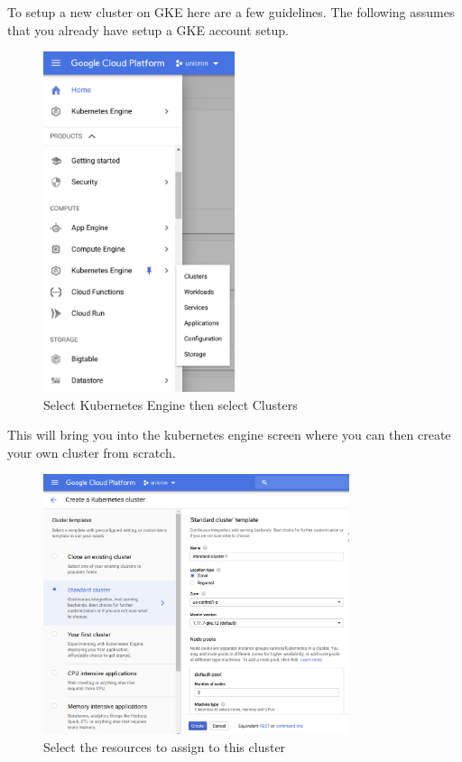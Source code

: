 To setup a new cluster on GKE here are a few guidelines. The following assumes that you already have setup a GKE account setup.

\begin{figure}[!h]
  \centering
    \includegraphics[width=0.5\textwidth]{figures/gke-setup-1.png}
    \caption{Select Kubernetes Engine then select Clusters}
    \label{fig:https-handshake}
\end{figure}

\FloatBarrier

This will bring you into the kubernetes engine screen where you can then create your own cluster from scratch.

\begin{figure}[!h]
  \centering
    \includegraphics[width=0.8\textwidth]{figures/gke-setup-2.png}
    \caption{Select the resources to assign to this cluster}
    \label{fig:https-handshake}
\end{figure}

